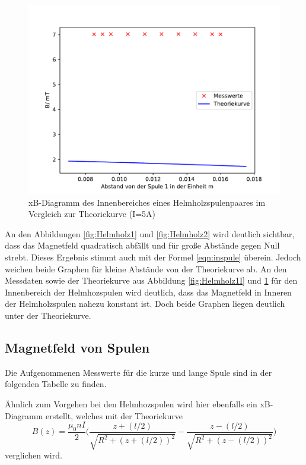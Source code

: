 \begin{figure}[H]
  \centering
  \includegraphics{Helmholz2I.pdf}
  \caption{xB-Diagramm des Innenbereiches eines
  Helmholzspulenpaares im Vergleich zur Theoriekurve
  (I=5A)}
  \label{fig:Helmholz2I}
\end{figure}
\noindent An den Abbildungen \ref{fig:Helmholz1}
und \ref{fig:Helmholz2} wird deutlich sichtbar, dass
das Magnetfeld quadratisch abfällt und für große Abstände
gegen Null strebt. Dieses Ergebnis stimmt auch mit
der Formel \ref{eqn:inspule} überein. Jedoch weichen beide
Graphen für kleine Abstände von der Theoriekurve ab.
\noindent An den Messdaten sowie der Theoriekurve aus
Abbildung \ref{fig:Helmholz1I} und \ref{fig:Helmholz2I}
für den Innenbereich der Helmhozspulen wird deutlich, dass
das Magnetfeld in Inneren der Helmholzspulen
nahezu konstant ist. Doch beide Graphen liegen
deutlich unter der Theoriekurve.


\subsection{Magnetfeld von Spulen}
\noindent Die Aufgenommenen Messwerte für die kurze und lange
Spule sind in der folgenden Tabelle zu finden.

Ähnlich zum Vorgehen bei den Helmhozspulen wird hier
ebenfalls ein xB-Diagramm erstellt, welches mit
der Theoriekurve
\begin{equation}
  B(z)=\frac{\mu_{0}nI}{2}\Biggl(\frac{z+(l/2)}{\sqrt{R^2+(z+(l/2))^2}}-\frac{z-(l/2)}{\sqrt{R^2+(z-(l/2))^2}}\Biggr)
  \label{eqn:inspule}
\end{equation}
verglichen wird.

